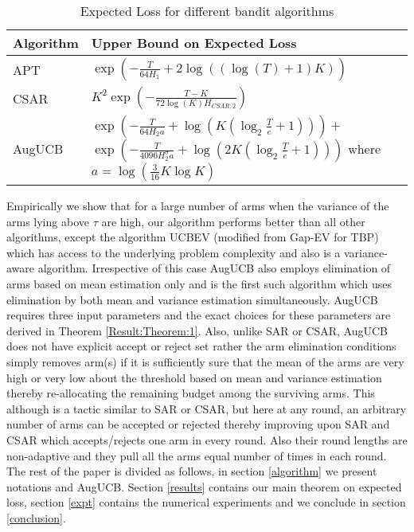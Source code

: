 \begin{table}[!h]
\caption{Expected Loss for different bandit algorithms}
\label{tab:regret-bds}
\begin{center}
\begin{tabular}{|p{1.3cm}|p{6.33cm}|}
\toprule
Algorithm  & Upper Bound on Expected Loss \\
\midrule
APT         &$\exp(-\frac{T}{64 H_1}+2\log((\log(T)+1)K))$ \\\midrule
CSAR		&$K^2\exp(-\frac{T-K}{72\log(K)H_{CSAR,2}})$ \\\midrule
AugUCB      &
$\exp\left( -\frac{T}{ 64 H_2 a} + \log\left(K\left(\log_2\frac{T}{e}+1\right)\right)\right)+$\newline
 $ \exp\left(- \frac{T}{4096 H_{2}^{\sigma} a}
 + \log\left(2K\left(\log_2\frac{T}{e}+1\right)\right) \right) $\newline
 where $a=\log(\frac{3}{16} K\log K)$
\\\bottomrule
\end{tabular}
\end{center}
\end{table}
Empirically we show that for a large number of arms when the variance of the arms lying above $\tau$ are high, our algorithm performs better than all other algorithms, except the algorithm UCBEV (modified from Gap-EV for TBP) which has access to the underlying problem complexity and also is a variance-aware algorithm. Irrespective of this case AugUCB also employs elimination of arms based on mean estimation only and is the first such algorithm which uses elimination by both mean and variance estimation simultaneously. AugUCB requires three input parameters and the exact choices for these parameters are derived in Theorem \ref{Result:Theorem:1}. Also, unlike SAR or CSAR, AugUCB does not have explicit accept or reject set rather the arm elimination conditions simply removes arm(s) if it is sufficiently sure that the mean of the arms are very high or very low about the threshold based on mean and variance estimation thereby re-allocating the remaining budget among the surviving arms. This although is a tactic similar to SAR or CSAR, but here at any round, an arbitrary number of arms can be accepted or rejected thereby improving upon SAR and CSAR which accepts/rejects one arm in every round. Also their round lengths are non-adaptive and they pull all the arms equal number of times in each round. 
The rest of the paper is divided as follows, in section \ref{algorithm} we present notations and AugUCB. 
Section \ref{results} contains our main theorem on expected loss, section \ref{expt} contains the numerical experiments and we conclude in section \ref{conclusion}.


  